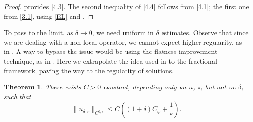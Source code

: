 \documentclass[11pt, reqno]{amsart}
\newtheorem{theorem}{Theorem}
\numberwithin{equation}{section}
\numberwithin{theorem}{section}
\numberwithin{lemma}{section}
\numberwithin{corollary}{section}
\numberwithin{remark}{section}
\numberwithin{proposition}{section}
\numberwithin{definition}{section}
\begin{document}
\begin{proof}
     provides \eqref{4.3}. The second inequality of \eqref{4.4} follows from \eqref{4.1}; the first one from \eqref{3.1}, using \eqref{EL} and .
\end{proof}
To pass to the limit, as $\delta\to0$, we need uniform in $\delta$ estimates. Observe that since we are dealing with a non-local operator, we cannot expect higher regularity, as in \cite{Y16,TU17}. A way to bypass the issue would be using the flatness improvement technique, as in \cite{DT19,PT16}. Here we extrapolate the idea used in \cite{Y16} to the fractional framework, paving the way to the regularity of solutions.
\begin{theorem}\label{t4.1}
	There exists $C>0$ constant, depending only on $n$, $s$, but not on $\delta$, such that
	$$
	\|u_{\delta,\varepsilon}\|_{C^{0,s}}\leq C\left((1+\delta)C_\varphi+	\frac{1}{\varepsilon}\right).
	$$
\end{theorem}
\end{document}
